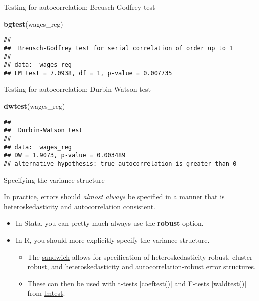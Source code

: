 \documentclass[ignorenonframetext,]{beamer}
\newenvironment{Shaded}{\begin{snugshade}}{\end{snugshade}}
\newcommand{\KeywordTok}[1]{\textcolor[rgb]{0.26,0.66,0.93}{\textbf{#1}}}
\newcommand{\NormalTok}[1]{\textcolor[rgb]{0.74,0.68,0.62}{#1}}
\begin{document}
\begin{frame}[fragile]{Testing for autocorrelation: Breusch-Godfrey
test}

\begin{Shaded}
\begin{Highlighting}[]
\KeywordTok{bgtest}\NormalTok{(wages_reg)}
\end{Highlighting}
\end{Shaded}

\begin{verbatim}
## 
##  Breusch-Godfrey test for serial correlation of order up to 1
## 
## data:  wages_reg
## LM test = 7.0938, df = 1, p-value = 0.007735
\end{verbatim}

\end{frame}

\begin{frame}[fragile]{Testing for autocorrelation: Durbin-Watson test}

\begin{Shaded}
\begin{Highlighting}[]
\KeywordTok{dwtest}\NormalTok{(wages_reg)}
\end{Highlighting}
\end{Shaded}

\begin{verbatim}
## 
##  Durbin-Watson test
## 
## data:  wages_reg
## DW = 1.9073, p-value = 0.003489
## alternative hypothesis: true autocorrelation is greater than 0
\end{verbatim}

\end{frame}

\begin{frame}{Specifying the variance structure}

In practice, errors should \emph{almost always} be specified in a manner
that is heteroskedasticity and autocorrelation consistent.

\begin{itemize}
\item
  In Stata, you can pretty much always use the \textbf{robust} option.
\item
  In R, you should more explicitly specify the variance structure.

  \begin{itemize}
  \item
    The
    \href{https://cran.r-project.org/web/packages/sandwich/}{sandwich}
    allows for specification of heteroskedasticity-robust,
    cluster-robust, and heteroskedasticity and autocorrelation-robust
    error structures.
  \item
    These can then be used with t-tests
    {[}\href{https://www.rdocumentation.org/packages/lmtest/versions/0.9-35/topics/coeftest}{coeftest()}{]}
    and F-tests
    {[}\href{https://www.rdocumentation.org/packages/lmtest/versions/0.9-35/topics/waldtest}{waldtest()}{]}
    from \href{https://www.rdocumentation.org/packages/lmtest}{lmtest}.
  \end{itemize}
\end{itemize}

\end{frame}
\end{document}
